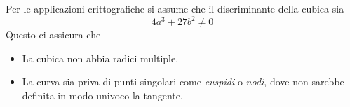 Per le applicazioni crittografiche si assume che il discriminante della cubica sia
\[ 4 a^3 + 27 b^2 \neq 0 \]
Questo ci assicura che
\begin{itemize}
	\item La cubica non abbia radici multiple.
	\item La curva sia priva di punti singolari come \emph{cuspidi} o \emph{nodi}, dove non sarebbe definita in modo
	      univoco la tangente.
\end{itemize}
